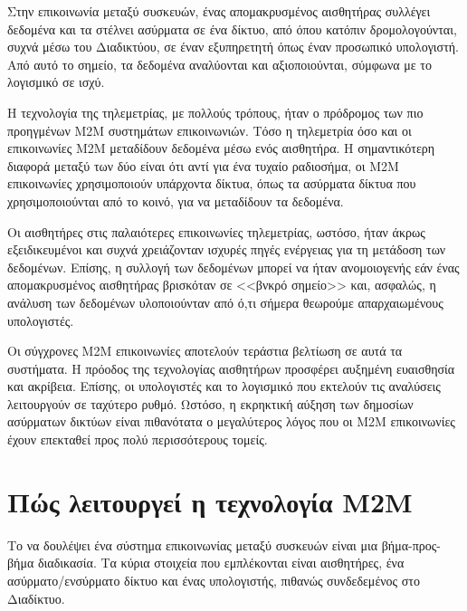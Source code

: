\documentclass[12pt, a4paper, oneside]{report}
\begin{document}
Στην επικοινωνία μεταξύ συσκευών, ένας απομακρυσμένος αισθητήρας συλλέγει δεδομένα και τα στέλνει ασύρματα σε ένα δίκτυο, από όπου κατόπιν δρομολογούνται, συχνά μέσω του Διαδικτύου, σε έναν εξυπηρετητή όπως έναν προσωπικό υπολογιστή. Από αυτό το σημείο, τα δεδομένα αναλύονται και αξιοποιούνται, σύμφωνα με το λογισμικό σε ισχύ.

Η τεχνολογία της τηλεμετρίας, με πολλούς τρόπους, ήταν ο πρόδρομος των πιο προηγμένων Μ2Μ συστημάτων επικοινωνιών. Τόσο η τηλεμετρία όσο και οι επικοινωνίες Μ2Μ μεταδίδουν δεδομένα μέσω ενός αισθητήρα. Η σημαντικότερη διαφορά μεταξύ των δύο είναι ότι αντί για ένα τυχαίο ραδιοσήμα, οι Μ2Μ επικοινωνίες χρησιμοποιούν υπάρχοντα δίκτυα, όπως τα ασύρματα δίκτυα που χρησιμοποιούνται από το κοινό, για να μεταδίδουν τα δεδομένα.

Οι αισθητήρες στις παλαιότερες επικοινωνίες τηλεμετρίας, ωστόσο, ήταν άκρως εξειδικευμένοι και συχνά χρειάζονταν ισχυρές πηγές ενέργειας για τη μετάδοση των δεδομένων. Επίσης, η συλλογή των δεδομένων μπορεί να ήταν ανομοιογενής εάν ένας απομακρυσμένος αισθητήρας βρισκόταν σε <<βνκρό σημείο>> και, ασφαλώς, η ανάλυση των δεδομένων υλοποιούνταν από ό,τι σήμερα θεωρούμε απαρχαιωμένους υπολογιστές.

Οι σύγχρονες Μ2Μ επικοινωνίες αποτελούν τεράστια βελτίωση σε αυτά τα συστήματα. Η πρόοδος της τεχνολογίας αισθητήρων προσφέρει αυξημένη ευαισθησία και ακρίβεια. Επίσης, οι υπολογιστές και το λογισμικό που εκτελούν τις αναλύσεις λειτουργούν σε ταχύτερο ρυθμό. Ωστόσο, η εκρηκτική αύξηση των δημοσίων ασύρματων δικτύων είναι πιθανότατα ο μεγαλύτερος λόγος που οι Μ2Μ επικοινωνίες έχουν επεκταθεί προς πολύ περισσότερους τομείς.

\section{Πώς λειτουργεί η τεχνολογία M2M}

Το να δουλέψει ένα σύστημα επικοινωνίας μεταξύ συσκευών είναι μια βήμα-προς-βήμα διαδικασία. Τα κύρια στοιχεία που εμπλέκονται είναι αισθητήρες, ένα ασύρματο\slash ενσύρματο δίκτυο και ένας υπολογιστής, πιθανώς συνδεδεμένος στο Διαδίκτυο.
\end{document}
